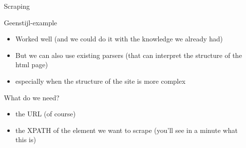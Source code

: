 \documentclass{beamer}
\begin{document}
\begin{frame}{Scraping}
\begin{block}{Geenstijl-example}
\begin{itemize}
\item<1->Worked well (and we could do it with the knowledge we already had)
\item<2->But we can also use existing parsers (that can interpret the structure of the html page)
\item<3->especially when the structure of the site is more complex 
\end{itemize}
\end{block}
\footnotesize{
}
\end{frame}




\begin{frame}{What do we need?}
\begin{itemize}
\item the URL (of course)
\item the XPATH of the element we want to scrape (you'll see in a minute what this is)
\end{itemize}
\end{frame}
\end{document}
